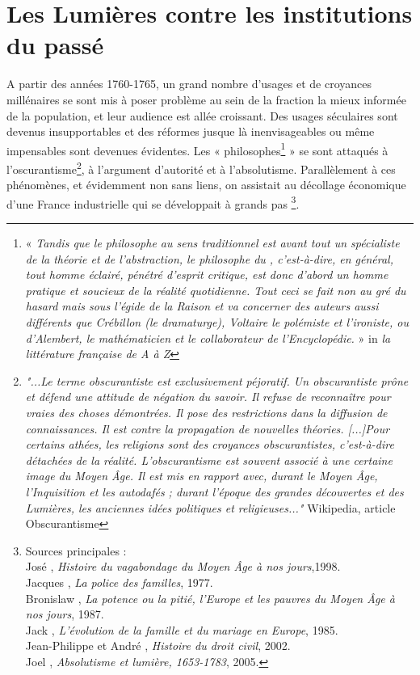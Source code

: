 

\chapter{Les Lumières contre les institutions du passé}


 A partir des années 1760-1765, un grand nombre d'usages et de croyances millénaires se sont mis à poser problème au sein de la fraction la mieux informée de la population, et leur audience est allée croissant. Des usages séculaires sont devenus insupportables et des réformes jusque là inenvisageables ou même impensables sont devenues évidentes. Les « philosophes\footnote{« \emph{Tandis que le philosophe au sens traditionnel est avant tout un spécialiste de la théorie et de l'abstraction, le philosophe du , c'est-à-dire, en général, tout homme éclairé, pénétré d'esprit critique, est donc d'abord un homme pratique et soucieux de la réalité quotidienne. Tout ceci se fait non au gré du hasard mais sous l'égide de la Raison et va concerner des auteurs aussi différents que Crébillon (le dramaturge), Voltaire le polémiste et l'ironiste, ou d'Alembert, le mathématicien et le collaborateur de l'Encyclopédie.} » in \emph{la littérature française de A à Z}} » se sont attaqués à l'oscurantisme\footnote{\emph{"...Le terme obscurantiste est exclusivement péjoratif. Un obscurantiste prône et défend une attitude de négation du savoir. Il refuse de reconnaître pour vraies des choses démontrées. Il pose des restrictions dans la diffusion de connaissances. Il est contre la propagation de nouvelles théories.
[...]Pour certains athées, les religions sont des croyances obscurantistes, c'est-à-dire détachées de la réalité.
L'obscurantisme est souvent associé à une certaine image du Moyen Âge. Il est mis en rapport avec, durant le Moyen Âge, l'Inquisition et les autodafés ; durant l'époque des grandes découvertes et des Lumières, les anciennes idées politiques et religieuses..."} Wikipedia, article Obscurantisme}, à l'argument d'autorité et à l'absolutisme.  Parallèlement à ces phénomènes, et évidemment non sans liens,  on assistait au décollage économique d'une France industrielle qui se développait à grands pas%
\footnote{Sources principales :
\\José , \emph{Histoire du vagabondage du Moyen Âge à nos jours},1998.
\\Jacques {}, \emph{La police des familles}, 1977.
\\Bronislaw {}, \emph{La potence ou la pitié, l'Europe et les pauvres du Moyen Âge à nos jours}, 1987.
\\Jack {}, \emph{L'évolution de la famille et du mariage en Europe}, 1985.
\\Jean-Philippe  et André , \emph{Histoire du droit civil}, 2002.
\\Joel {}, \emph{Absolutisme et lumière, 1653-1783}, 2005. }.

